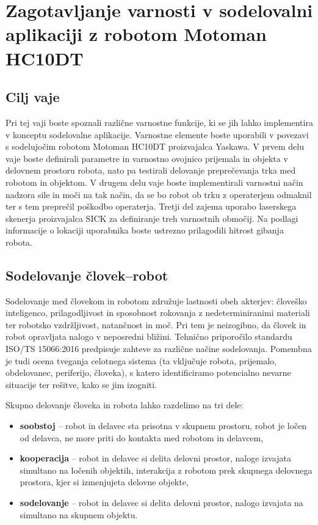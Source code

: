 \chapter{Zagotavljanje varnosti v sodelovalni aplikaciji z robotom Motoman HC10DT}%


\begin{mdframed}[backgroundcolor=green!20, shadow=true,roundcorner=8pt]
	\vspace{-0.35cm}
	
	\section{Cilj vaje}
	
	Pri tej vaji boste spoznali različne varnostne funkcije, ki se jih lahko implementira v konceptu sodelovalne aplikacije. Varnostne elemente boste uporabili v povezavi s sodelujočim robotom Motoman HC10DT proizvajalca Yaskawa. V prvem delu vaje boste definirali parametre in varnostno ovojnico prijemala in objekta v delovnem prostoru robota, nato pa testirali delovanje preprečevanja trka med robotom in objektom. V drugem delu vaje boste implementirali varnostni način nadzora sile in moči na tak način, da se bo robot ob trku z operaterjem  odmaknil ter s tem preprečil poškodbo operaterja. Tretji del zajema uporabo laserskega skenerja proizvajalca SICK za definiranje treh varnostnih območij. Na podlagi informacije o lokaciji uporabnika boste ustrezno prilagodili hitrost gibanja robota.
	
\end{mdframed}

\section{Sodelovanje človek--robot}

Sodelovanje med človekom in robotom združuje lastnosti obeh akterjev: človeško inteligenco, prilagodljivost in sposobnost rokovanja z nedeterminiranimi materiali ter robotsko vzdržljivost, natančnost in moč. Pri tem je neizogibno, da človek in robot opravljata nalogo v neposredni bližini. Tehnično priporočilo standardu ISO/TS 15066:2016 predpisuje zahteve za različne načine sodelovanja. Pomembna je tudi ocena tveganja celotnega sistema (ta vključuje robota, prijemalo, obdelovanec, periferijo, človeka), s katero identificiramo potencialno nevarne situacije ter rešitve, kako se jim izogniti.

Skupno delovanje človeka in robota lahko razdelimo na tri dele:
\begin{itemize}
	\item \textbf{soobstoj} -- robot in delavec sta prisotna v skupnem prostoru, robot je ločen od delavca, ne more priti do kontakta med robotom in delavcem,
	\item \textbf{kooperacija} -- robot in delavec si delita delovni prostor, naloge izvajata simultano na ločenih objektih, interakcija z robotom prek skupnega delovnega prostora, kjer si izmenjujeta delovne objekte,
	\item  \textbf{sodelovanje} -- robot in delavec si delita delovni prostor, nalogo izvajata na simultano na skupnem objektu.
\end{itemize}


